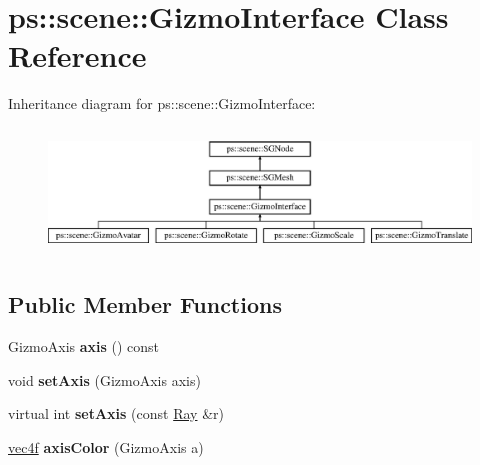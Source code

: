 \hypertarget{classps_1_1scene_1_1GizmoInterface}{}\section{ps\+:\+:scene\+:\+:Gizmo\+Interface Class Reference}
\label{classps_1_1scene_1_1GizmoInterface}
Inheritance diagram for ps\+:\+:scene\+:\+:Gizmo\+Interface\+:\begin{figure}[H]
\begin{center}
\leavevmode
\includegraphics[height=3.393939cm]{classps_1_1scene_1_1GizmoInterface}
\end{center}
\end{figure}
\subsection*{Public Member Functions}
\begin{DoxyCompactItemize}
\item 
\hypertarget{classps_1_1scene_1_1GizmoInterface_a3d8d2479ac8edc86bc3cdfe3161cece1}{}Gizmo\+Axis {\bfseries axis} () const \label{classps_1_1scene_1_1GizmoInterface_a3d8d2479ac8edc86bc3cdfe3161cece1}

\item 
\hypertarget{classps_1_1scene_1_1GizmoInterface_af83f0e916e3037a3fac3acf1f925be54}{}void {\bfseries set\+Axis} (Gizmo\+Axis axis)\label{classps_1_1scene_1_1GizmoInterface_af83f0e916e3037a3fac3acf1f925be54}

\item 
\hypertarget{classps_1_1scene_1_1GizmoInterface_ac506854a9d644957bba1d44892e62454}{}virtual int {\bfseries set\+Axis} (const \hyperlink{classps_1_1base_1_1Ray}{Ray} \&r)\label{classps_1_1scene_1_1GizmoInterface_ac506854a9d644957bba1d44892e62454}

\item 
\hypertarget{classps_1_1scene_1_1GizmoInterface_a567abdf171320701708f2bfa97cac858}{}\hyperlink{classps_1_1base_1_1Vec4}{vec4f} {\bfseries axis\+Color} (Gizmo\+Axis a)\label{classps_1_1scene_1_1GizmoInterface_a567abdf171320701708f2bfa97cac858}

\end{DoxyCompactItemize}
